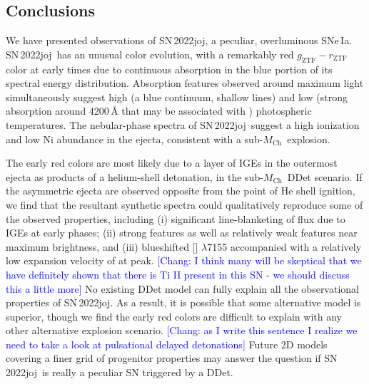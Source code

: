 \documentclass[twocolumn]{aastex631}
\newcommand{\sn}{SN\,2022joj}
\newcommand{\Mch}{$M_\mathrm{Ch}$}
\newcommand{\chang}[1]{\textcolor{blue}{[Chang: #1]}}
\begin{document}
\begin{CJK*}{UTF8}{gbsn}
\section{Conclusions} \label{sec:conclusion}
We have presented observations of \sn, a peculiar, overluminous SNe\,Ia. \sn\ has an unusual color evolution, with a remarkably red $g_\mathrm{ZTF}-r_\mathrm{ZTF}$ color at early times due to continuous absorption in the blue portion of its spectral energy distribution. Absorption features observed around maximum light simultaneously suggest high (a blue continuum, shallow  lines) and low (strong absorption around 4200\,\r{A} that may be associated with ) photospheric temperatures. The nebular-phase spectra of \sn\ suggest a high ionization and low Ni abundance in the ejecta, consistent with a sub-\Mch\ explosion.

The early red colors are most likely due to a layer of IGEs in the outermost ejecta as products of a helium-shell detonation, in the sub-\Mch\ DDet scenario. If the asymmetric ejecta are observed opposite from the point of He shell ignition, we find that the resultant synthetic spectra could qualitatively reproduce some of the observed properties, including (i) significant line-blanketing of flux due to IGEs at early phases; (ii) strong  features as well as relatively weak  features near maximum brightness, and (iii) blueshifted [] $\lambda$7155 accompanied with a relatively low expansion velocity of  at peak. \chang{I think many will be skeptical that we have definitely shown that there is Ti II present in this SN - we should discuss this a little more} No existing DDet model can fully explain all the observational properties of \sn. As a result, it is possible that some alternative model is superior, though we find the early red colors are difficult to explain with any other alternative explosion scenario. \chang{as I write this sentence I realize we need to take a look at pulsational delayed detonations}  Future 2D models covering a finer grid of progenitor properties may answer the question if \sn\ is really a peculiar SN triggered by a DDet.\\



\end{CJK*}
\end{document}
